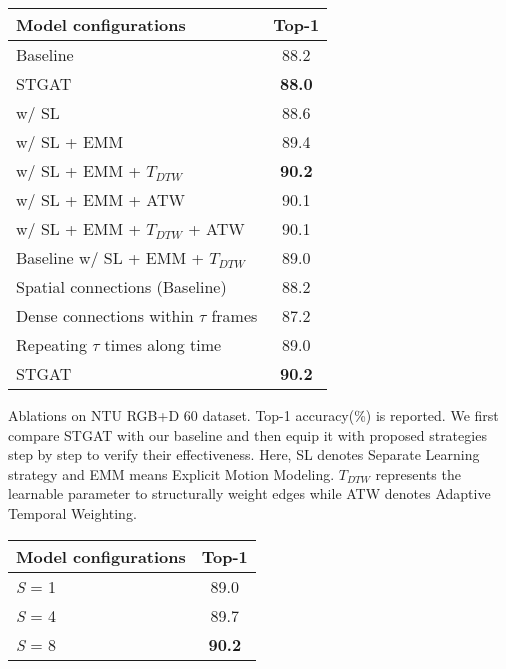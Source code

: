 \documentclass[runningheads]{llncs}
\begin{document}
\begin{minipage}{\textwidth}
\begin{minipage}[t]{0.53\textwidth}
\makeatletter{}
\centering
          \begin{tabular}[t]{l|c} 
          \hline
          \textbf{Model configurations}  & \textbf{Top-1} \\
          \hline
          \hline
          Baseline  & 88.2\\
          STGAT & \textbf{88.0}\\
          \hline
          \hline
          w/ SL  & 88.6\\
          w/ SL + EMM & 89.4 \\
          w/ SL + EMM + $ T_{DTW}$  & \textbf{90.2}\\
          w/ SL + EMM + ATW & 90.1\\
          w/ SL + EMM + $T_{DTW}$ + ATW & 90.1\\
          Baseline w/ SL + EMM + $T_{DTW}$ & 89.0\\
          \hline
          Spatial connections (Baseline) & 88.2 \\
          Dense connections within $\tau$ frames & 87.2 \\
          Repeating $\tau$ times along time & 89.0\\
          STGAT & \textbf{90.2} \\
          \hline
        \end{tabular}
\caption{Ablations on NTU RGB+D 60 dataset. Top-1 accuracy(\%) is reported. We first compare STGAT with our baseline and then equip it with proposed strategies step by step to verify their effectiveness. Here, SL denotes Separate Learning strategy and EMM means Explicit Motion Modeling. $T_{DTW}$ represents the learnable parameter to structurally weight edges while ATW denotes Adaptive Temporal Weighting.}
        \label{table1} 
        \end{minipage}
        \begin{minipage}[t]{0.46\textwidth}
        \makeatletter{}
        \centering
        \begin{tabular}[t]{l|c} 
        \hline
        \textbf{Model configurations}  & \textbf{Top-1} \\
          \hline
          \hline
\textit{S} = 1 & 89.0\\
          \textit{S} = 4 & 89.7\\  
          \textit{S} = 8 & \textbf{90.2}\\ 

\end{tabular}
\end{minipage}
\end{minipage}
\end{document}
